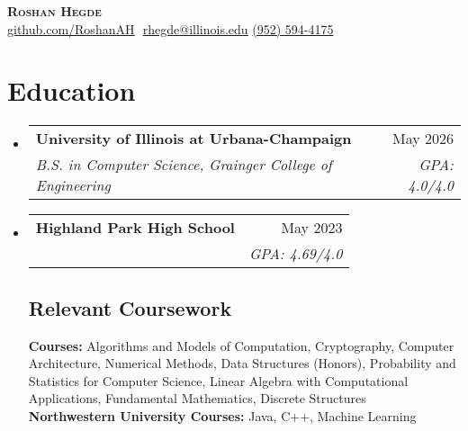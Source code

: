\documentclass[letterpaper,11pt]{article}
\makeatletter
\newcommand{\resumeSubheading}[4]{
  \vspace{-2pt}\item
    \begin{tabular*}{0.97\textwidth}[t]{l@{\extracolsep{\fill}}r}
      \textbf{#1} & #2 \\
      \textit{\small#3} & \textit{\small #4} \\
    \end{tabular*}\vspace{-7pt}
}
\newcommand{\resumeSubHeadingListStart}{\begin{itemize}[leftmargin=0.15in, label={}]}
\newcommand{\resumeSubHeadingListEnd}{\end{itemize}}
\makeatother
\begin{document}
\vspace{-7pt}

\begin{center}
    \textbf{\Huge \scshape Roshan Hegde} \\ \vspace{8pt}
    \small 
    \href{https://github.com/RoshanAH}{\underline{github.com/RoshanAH}} $  $
    \href{mailto:rhegde@illinois.edu}{\underline{rhegde@illinois.edu}}
    {\underline{(952) 594-4175}}
\end{center}

\section{Education}
  \resumeSubHeadingListStart
  
    \resumeSubheading
      {University of Illinois at Urbana-Champaign}{May 2026}
      {B.S. in Computer Science, Grainger College of Engineering}
      {GPA: 4.0/4.0}
    
    \resumeSubheading
      {Highland Park High School}{May 2023}
      {}{GPA: 4.69/4.0}

    \vspace{-10pt}
    \subsection{Relevant Coursework}
      \textbf{Courses:} 
      Algorithms and Models of Computation,
      Cryptography,
      Computer Architecture,
      Numerical Methods,
      Data Structures (Honors),
      Probability and Statistics for Computer Science,
      Linear Algebra with Computational Applications,
      Fundamental Mathematics,
      Discrete Structures
      \\

      \textbf{Northwestern University Courses:} Java, C++, Machine Learning
  \resumeSubHeadingListEnd

\end{document}
